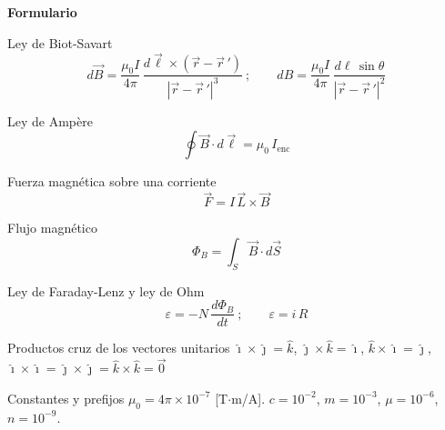 \documentclass[addpoints,12pt]{exam}
\begin{document}
\begin{center}{\large\textbf{Formulario}}\end{center}
\vspace{-0.1cm}

\begin{formbox}{Ley de Biot-Savart}
\[
    d\vec{B}=\frac{\mu_0 I}{4\pi}\,\frac{d\vec{\ell}\times(\vec{r}-\vec{r}\,')}{|\vec{r}-\vec{r}\,'|^{3}}
    \ ;\qquad
    dB=\frac{\mu_0 I}{4\pi}\,\frac{d\ell\,\sin\theta}{|\vec{r}-\vec{r}\,'|^{2}}
\]
\end{formbox}

\begin{formbox}{Ley de Amp\`ere}
\[
    \oint\vec{B}\cdot d\vec{\ell}=\mu_0\,I_{\text{enc}}
\]
\end{formbox}

\begin{formbox}{Fuerza magn\'etica sobre una corriente}
\[
    \vec{F}=I\,\vec{L}\times\vec{B}
\]
\end{formbox}

\begin{formbox}{Flujo magn\'etico}
\[
    \Phi_B=\int_S\vec{B}\cdot d\vec{S}
\]
\end{formbox}

\begin{formbox}{Ley de Faraday-Lenz y ley de Ohm}
\[
    \varepsilon=-N\,\frac{d\Phi_B}{dt}\ ;\qquad \varepsilon=i\,R
\]
\end{formbox}

\begin{formbox}{Productos cruz de los vectores unitarios}
\centering
$\hat{\imath}\times\hat{\jmath}=\hat{k}$,\quad
$\hat{\jmath}\times\hat{k}=\hat{\imath}$,\quad
$\hat{k}\times\hat{\imath}=\hat{\jmath}$,\qquad
$\hat{\imath}\times\hat{\imath}=\hat{\jmath}\times\hat{\jmath}=\hat{k}\times\hat{k}=\vec{0}$
\end{formbox}

\begin{formbox}{Constantes y prefijos}
$\mu_0=4\pi\times10^{-7}$ [T$\cdot$m/A]. \qquad
$c=10^{-2}$, \quad $m=10^{-3}$, \quad $\mu=10^{-6}$, \quad $n=10^{-9}$.
\end{formbox}
\end{document}
